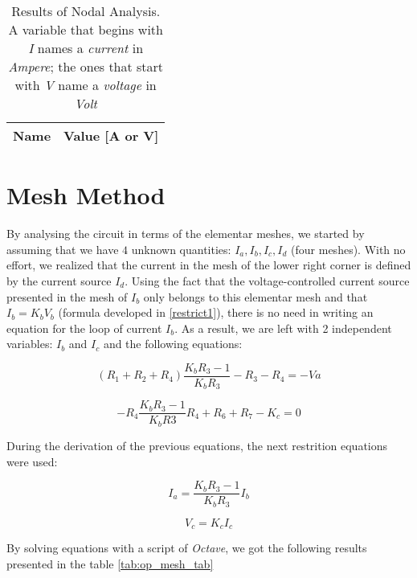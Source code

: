 \begin{table}[b]
  \centering
  \begin{tabular}{|l|r|}
    \hline
    {\bf Name} & {\bf Value [A or V]} \\ \hline
    
  \end{tabular}
  \caption{Results of Nodal Analysis. A variable that begins  with \textit{I} names a \textit{current} in \textit{Ampere}; the ones that start with \textit{V} name a \textit{voltage} in \textit{Volt} }
  \label{tab:op_nodal_tab}
\end{table}



\section{Mesh Method}

By analysing the circuit in terms of the elementar meshes, we started by assuming that we have $4$ unknown quantities: $I_a, I_b, I_c, I_d$ (four meshes).
With no effort, we realized that the current in the mesh of the lower right corner is defined by the current source $I_d$.
Using the fact that the voltage-controlled current source presented in the mesh of $I_b$ only belongs to this elementar mesh and that $I_b = K_b V_b$ (formula developed in \ref{restrict1}), there is no need in writing an equation for the loop of current $I_b$.
As a result, we are left with 2 independent variables: $I_b$ and $I_c$ and the following equations:


\begin{equation}
  (R_1 + R_2 + R_4) \frac{K_b R_3 -1}{K_b R_3}  - R_3  - R_4 = -Va
  \label{mesh1}
\end{equation}

\begin{equation}
  -R_4 \frac{K_b R_3 - 1}{K_b R3} R_4 + R_6 + R_7 - K_c = 0
  \label{mesh2}
\end{equation}

During the derivation of the previous equations, the next restrition equations were used:

\begin{equation}
  I_a = \frac{K_b R_3 -1}{K_b R_3} I_b
  \label{restrict1}
\end{equation}

\begin{equation}
  V_c = K_c I_c
  \label{restrict2}
\end{equation}

By solving equations with a script of \textit{Octave}, we got the following results presented in the table \ref{tab:op_mesh_tab}

